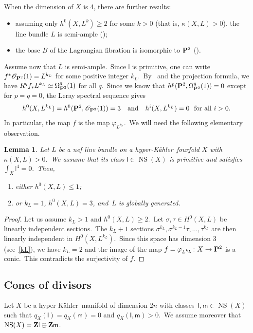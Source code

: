 \documentclass[12pt]{amsart}
\def\cO{\mathscr{O}}
\def\Z{{\bf Z}}
\def\P{{\bf P}}
\def\phi{\varphi}
\DeclareMathOperator{\NS}{NS}
\def\otp{}
\def\isom{\simeq}
\def\hk{hyper-K\"ahler}
\newtheorem{lemm}{Lemma}[section]
\theoremstyle{remark}
\def\lll{\ensuremath{\mathsf l}}
\def\mm{\ensuremath{\mathsf m}}
\begin{document}
When the dimension of $X$ is 4, there are further results:
\begin{itemize}
\item assuming only $h^0(X,L^{\otp k})\ge 2$ for some $k>0$ (that is,  $\kappa(X,L)>0$), the line bundle $L$ is semi-ample (\cite[Theorem~1.5]{fuk});
\item the base $B$ of the Lagrangian fibration is isomorphic to $\P^2$ (\cite{hx}).
\end{itemize}
Assume now that $L$ is semi-ample.\ Since $\lll$ is primitive, one can   write $f^*\cO_{\P^2}(1)=L^{k_L}$ for some positive integer $k_L$.\
By~\cite[Theorem~1.3]{mathigher} and the projection formula, we have
$R^qf_*L^{k_L} \isom \Omega_{\P^2}^q(1)$ for all $q$.\
Since we know that $h^p(\P^2,\Omega_{\P^2}^q(1))=0$ except for $p=q=0$, the Leray spectral sequence gives
\begin{equation}\label{kL}
h^0(X,L^{k_L}) = h^0(\P^2, \cO_{\P^2}(1))=3\quad\textnormal{and}\quad h^i(X,L^{k_L}) =0\ \ \textnormal{for all } i>0.
\end{equation}
In particular, the map $f $ is the map $ \phi_{L^{k_L}}$.\ We will need the following elementary observation.

\begin{lemm}\label{lem:H0large}
Let $L$ be a nef line bundle on a  \hk\ fourfold $X$ with $\kappa(X,L)>0$.\
We assume that its class $\lll\in\NS(X)$ is primitive and satisfies $\int_X\lll^4=0$.\
Then,
\begin{enumerate}[{\rm (a)}]
\item either $h^0(X,L)\le1$;
\item or $k_L=1$, $h^0(X,L)=3$, and~$L$ is globally generated.
\end{enumerate}
\end{lemm}

\begin{proof}
Let us assume  $k_L>1$ and $h^0(X,L)\ge2$.\ Let $\sigma,\tau\in H^0(X,L)$ be
linearly independent sections.\ The $k_L+1$ sections  $\sigma^{k_L},\sigma^{k_L-1}\tau,\dots,\tau^{k_L}$ are then linearly independent in $H^0(X,L^{\otp k_L})$.\ Since this space has dimension 3 (see~\eqref{kL}), we have $k_L=2$ and the image of the map $f=\phi_{L^{k_L}}\colon X\to \P^2$ is a conic.\ This  contradicts the surjectivity of $f$.
\end{proof}


\subsection{Cones of divisors}\label{subsec:ConeDivisors}
Let $X$ be a \hk\ manifold of dimension $2n$ with   classes~$\lll, \mm\in \NS(X)$ such that $q_X(\lll)=q_X(\mm)=0$ and $q_X(\lll,\mm)>0$.\
We assume moreover that $\NS(X)=\Z \lll\oplus \Z \mm$.
\end{document}
